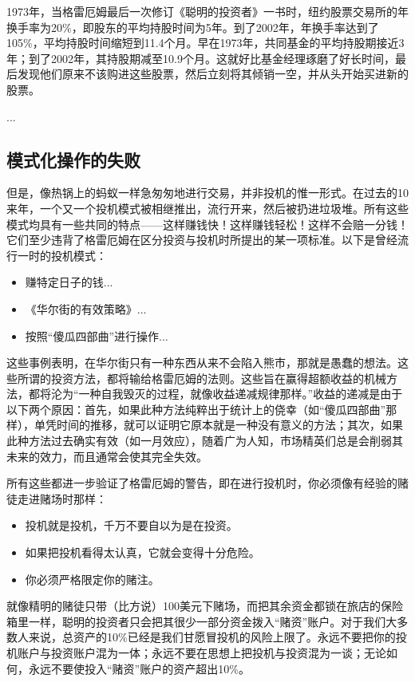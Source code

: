 \documentclass[12pt,oneside]{book}
\begin{document}
1973年，当格雷厄姆最后一次修订《聪明的投资者》一书时，纽约股票交易所的年换手率为20\%，即股东的平均持股时间为5年。到了2002年，年换手率达到了105\%，平均持股时间缩短到11.4个月。早在1973年，共同基金的平均持股期接近3年；到了2002年，其持股期减至10.9个月。这就好比基金经理琢磨了好长时间，最后发现他们原来不该购进这些股票，然后立刻将其倾销一空，并从头开始买进新的股票。

...



\subsection{模式化操作的失败}
但是，像热锅上的蚂蚁一样急匆匆地进行交易，并非投机的惟一形式。在过去的10来年，一个又一个投机模式被相继推出，流行开来，然后被扔进垃圾堆。所有这些模式均具有一些共同的特点——这样赚钱快！这样赚钱轻松！这样不会赔一分钱！它们至少违背了格雷厄姆在区分投资与投机时所提出的某一项标准。以下是曾经流行一时的投机模式：

\begin{itemize}
\item 赚特定日子的钱...

\item 《华尔街的有效策略》...

\item 按照“傻瓜四部曲”进行操作...

\end{itemize}


这些事例表明，在华尔街只有一种东西从来不会陷入熊市，那就是愚蠢的想法。这些所谓的投资方法，都将输给格雷厄姆的法则。这些旨在赢得超额收益的机械方法，都将沦为“一种自我毁灭的过程，就像收益递减规律那样。”收益的递减是由于以下两个原因：首先，如果此种方法纯粹出于统计上的侥幸（如“傻瓜四部曲”那样），单凭时间的推移，就可以证明它原本就是一种没有意义的方法；其次，如果此种方法过去确实有效（如一月效应），随着广为人知，市场精英们总是会削弱其未来的效力，而且通常会使其完全失效。


所有这些都进一步验证了格雷厄姆的警告，即在进行投机时，你必须像有经验的赌徒走进赌场时那样：

\begin{itemize}
\item 投机就是投机，千万不要自以为是在投资。
\item 如果把投机看得太认真，它就会变得十分危险。
\item 你必须严格限定你的赌注。
\end{itemize}


就像精明的赌徒只带（比方说）100美元下赌场，而把其余资金都锁在旅店的保险箱里一样，聪明的投资者只会把其很少一部分资金拨入“赌资”账户。对于我们大多数人来说，总资产的10\%已经是我们甘愿冒投机的风险上限了。永远不要把你的投机账户与投资账户混为一体；永远不要在思想上把投机与投资混为一谈；无论如何，永远不要使投入“赌资”账户的资产超出10\%。
\end{document}
